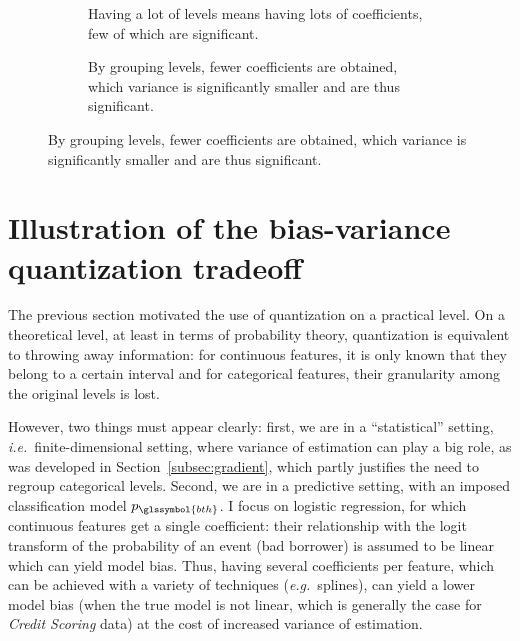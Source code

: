\begin{figure}[!ht]
\begin{subfigure}[t]{0.5\textwidth}
\centering \resizebox{\textwidth}{!}{}
\caption{Having a lot of levels means having lots of coefficients, few of which are significant.}
\label{fig:csp_estim}
\end{subfigure}
\begin{subfigure}[t]{0.5\textwidth}
\centering \resizebox{\textwidth}{!}{}
\caption{By grouping levels, fewer coefficients are obtained, which variance is significantly smaller and are thus significant.}
\label{fig:csp_estim_disc}
\end{subfigure}
\end{figure}

\section{Illustration of the bias-variance quantization tradeoff} \label{sec:bias_variance_quant}
 

The previous section motivated the use of quantization on a practical level. On a theoretical level, at least in terms of probability theory, quantization is equivalent to throwing away information: for continuous features, it is only known that they belong to a certain interval and for categorical features, their granularity among the original levels is lost.

However, two things must appear clearly: first, we are in a ``statistical'' setting, \textit{i.e.}\ finite-dimensional setting, where variance of estimation can play a big role, as was developed in Section~\ref{subsec:gradient}, which partly justifies the need to regroup categorical levels. Second, we are in a predictive setting, with an imposed classification model $p_{\glssymbol{bth}}$. I focus on logistic regression, for which continuous features get a single coefficient: their relationship with the logit transform of the probability of an event (bad borrower) is assumed to be linear which can yield model bias. Thus, having several coefficients per feature, which can be achieved with a  variety of techniques (\textit{e.g.}\ splines), can yield a lower model bias (when the true model is not linear, which is generally the case for \textit{Credit Scoring} data) at the cost of increased variance of estimation.

